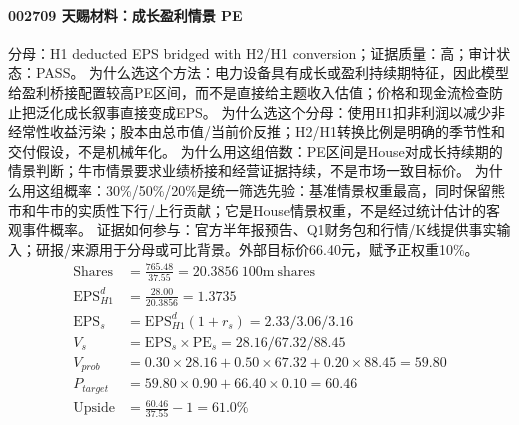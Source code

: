 \paragraph{002709 天赐材料：成长盈利情景 PE}
分母：H1 deducted EPS bridged with H2/H1 conversion；证据质量：高；审计状态：PASS。
为什么选这个方法：电力设备具有成长或盈利持续期特征，因此模型给盈利桥接配置较高PE区间，而不是直接给主题收入估值；价格和现金流检查防止把泛化成长叙事直接变成EPS。
为什么选这个分母：使用H1扣非利润以减少非经常性收益污染；股本由总市值/当前价反推；H2/H1转换比例是明确的季节性和交付假设，不是机械年化。
为什么用这组倍数：PE区间是House对成长持续期的情景判断；牛市情景要求业绩桥接和经营证据持续，不是市场一致目标价。
为什么用这组概率：30\%/50\%/20\%是统一筛选先验：基准情景权重最高，同时保留熊市和牛市的实质性下行/上行贡献；它是House情景权重，不是经过统计估计的客观事件概率。
证据如何参与：官方半年报预告、Q1财务包和行情/K线提供事实输入；研报/来源用于分母或可比背景。外部目标价66.40元，赋予正权重10\%。
\begin{align*}
\mathrm{Shares} &= \frac{765.48}{37.55}=20.3856\ \mathrm{100m\ shares}\\
\mathrm{EPS}_{H1}^d &= \frac{28.00}{20.3856}=1.3735\\
\mathrm{EPS}_s &= \mathrm{EPS}_{H1}^d(1+r_s)=2.33/3.06/3.16\\
V_s &= \mathrm{EPS}_s\times \mathrm{PE}_s=28.16/67.32/88.45\\
V_{prob} &= 0.30\times 28.16+0.50\times 67.32+0.20\times 88.45=59.80\\
P_{target} &= 59.80\times 0.90+66.40\times 0.10=60.46\\
\mathrm{Upside} &= \frac{60.46}{37.55}-1=61.0\%\\
\end{align*}

